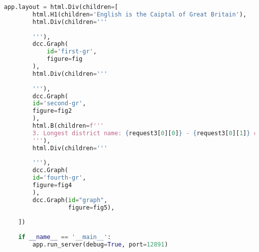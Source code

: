\begin{lstlisting}[language=Python, caption=Код;]
    app.layout = html.Div(children=[
        html.H1(children='English is the Caiptal of Great Britain'),
        html.Div(children='''
        
        '''),
        dcc.Graph(
            id='first-gr',
            figure=fig
        ),
        html.Div(children='''
                
        '''),
        dcc.Graph(
        id='second-gr',
        figure=fig2
        ),
        html.B(children=f'''
        3. Longest district name: {request3[0][0]} - {request3[0][1]} characters!
        '''),
        html.Div(children='''
                
        '''),
        dcc.Graph(
        id='fourth-gr',
        figure=fig4
        ),
        dcc.Graph(id="graph",
                  figure=fig5),
        
    ])
    
    if __name__ == '__main__':
        app.run_server(debug=True, port=12891)
\end{lstlisting}